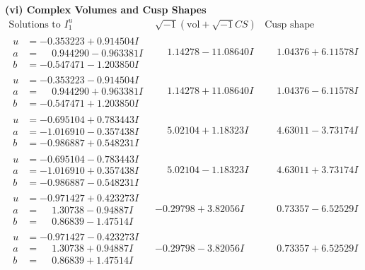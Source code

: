 \documentclass[1p]{elsarticle_modified}
\theoremstyle{definition}
\newcommand{\I}{\sqrt{-1}}
\begin{document}
\newpage\flushleft \textbf{(vi) Complex Volumes and Cusp Shapes}
$$\begin{array}{c|c|c}  
\text{Solutions to }I^u_{1}& \I (\text{vol} + \sqrt{-1}CS) & \text{Cusp shape}\\
 \hline 
\begin{aligned}
u &= -0.353223 + 0.914504 I \\
a &= \phantom{-}0.944290 - 0.963381 I \\
b &= -0.547471 - 1.203850 I\end{aligned}
 & \phantom{-}1.14278 - 11.08640 I & \phantom{-}1.04376 + 6.11578 I \\ \hline\begin{aligned}
u &= -0.353223 - 0.914504 I \\
a &= \phantom{-}0.944290 + 0.963381 I \\
b &= -0.547471 + 1.203850 I\end{aligned}
 & \phantom{-}1.14278 + 11.08640 I & \phantom{-}1.04376 - 6.11578 I \\ \hline\begin{aligned}
u &= -0.695104 + 0.783443 I \\
a &= -1.016910 - 0.357438 I \\
b &= -0.986887 + 0.548231 I\end{aligned}
 & \phantom{-}5.02104 + 1.18323 I & \phantom{-}4.63011 - 3.73174 I \\ \hline\begin{aligned}
u &= -0.695104 - 0.783443 I \\
a &= -1.016910 + 0.357438 I \\
b &= -0.986887 - 0.548231 I\end{aligned}
 & \phantom{-}5.02104 - 1.18323 I & \phantom{-}4.63011 + 3.73174 I \\ \hline\begin{aligned}
u &= -0.971427 + 0.423273 I \\
a &= \phantom{-}1.30738 - 0.94887 I \\
b &= \phantom{-}0.86839 - 1.47514 I\end{aligned}
 & -0.29798 + 3.82056 I & \phantom{-}0.73357 - 6.52529 I \\ \hline\begin{aligned}
u &= -0.971427 - 0.423273 I \\
a &= \phantom{-}1.30738 + 0.94887 I \\
b &= \phantom{-}0.86839 + 1.47514 I\end{aligned}
 & -0.29798 - 3.82056 I & \phantom{-}0.73357 + 6.52529 I \\ \hline\begin{aligned}

\end{aligned}
\end{array}$$
\end{document}
